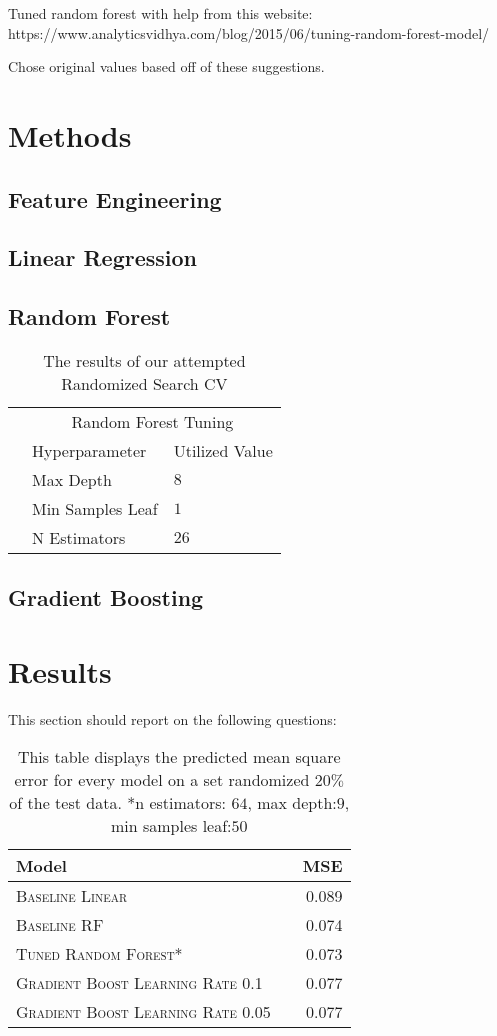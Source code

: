 \documentclass[11pt]{article}
\begin{document}
Tuned random forest with help from this website:
https://www.analyticsvidhya.com/blog/2015/06/tuning-random-forest-model/

Chose original values based off of these suggestions.

\section{Methods}
\subsection{Feature Engineering}
\subsection{Linear Regression}
\subsection{Random Forest}
  \begin{table}
  	\centering
  	\begin{tabular}{@{}lll@{}}
  		\toprule
  		&\multicolumn{2}{c}{Random Forest Tuning  } \\
  		& Hyperparameter & Utilized Value\\
  		\midrule
  		& Max Depth & $8$ \\
  		& Min Samples Leaf& $1$ \\
  		& N Estimators & $26$ \\
  		\bottomrule
  		
  	\end{tabular}
  	\caption{The results of our attempted Randomized Search CV}
  \end{table}
\subsection{Gradient Boosting}

\section{Results}
This section should report on the following questions: 

\begin{table}
	\centering
	\begin{tabular}{llr}
		\toprule
		Model &  & MSE \\
		\midrule
		\textsc{Baseline Linear} & & 0.089\\
		\textsc{Baseline RF} & & 0.074 \\
		\textsc{Tuned Random Forest*} & &0.073   \\
		\textsc{Gradient Boost Learning Rate 0.1} & & 0.077\\
		\textsc{Gradient Boost Learning Rate 0.05} & & 0.077\\
		\bottomrule
	\end{tabular}
	\caption{\label{tab:results} This table displays the predicted mean square error for every model on a set randomized $20\%$ of the test data. *n estimators: $64$, max depth:$9$, min samples leaf:$50$}
\end{table}
\end{document}
